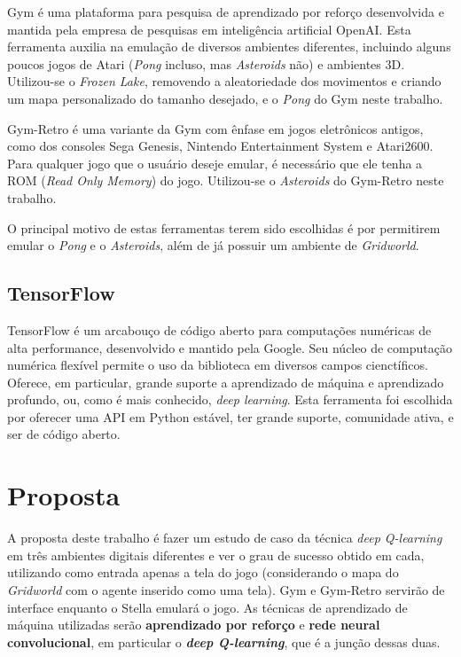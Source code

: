 Gym é uma plataforma para pesquisa de aprendizado por reforço desenvolvida e mantida pela empresa de pesquisas em inteligência artificial OpenAI.
Esta ferramenta auxilia na emulação de diversos ambientes diferentes, incluindo alguns poucos jogos de Atari (\textit{Pong} incluso, mas \textit{Asteroids} não) e ambientes 3D.
Utilizou-se o \textit{Frozen Lake}, removendo a aleatoriedade dos movimentos e criando um mapa personalizado do tamanho desejado, e o \textit{Pong} do Gym neste trabalho.

Gym-Retro é uma variante da Gym com ênfase em jogos eletrônicos antigos, como dos consoles Sega Genesis, Nintendo Entertainment System e Atari2600.
Para qualquer jogo que o usuário deseje emular, é necessário que ele tenha a ROM (\textit{Read Only Memory}) do jogo.
Utilizou-se o \textit{Asteroids} do Gym-Retro neste trabalho.

O principal motivo de estas ferramentas terem sido escolhidas é por permitirem emular o \textit{Pong} e o \textit{Asteroids}, além de já possuir um ambiente de \textit{Gridworld}.
\subsection{TensorFlow}
\label{sec:tensorflow}

TensorFlow é um arcabouço de código aberto para computações numéricas de alta performance, desenvolvido e mantido pela Google.
Seu núcleo de computação numérica flexível permite o uso da biblioteca em diversos campos cienctíficos.
Oferece, em particular, grande suporte a aprendizado de máquina e aprendizado profundo, ou, como é mais conhecido, \textit{deep learning}.
Esta ferramenta foi escolhida por oferecer uma API em Python estável, ter grande suporte, comunidade ativa, e ser de código aberto.


\section{Proposta}
\label{sec:proposta}

A proposta deste trabalho é fazer um estudo de caso da técnica \textit{deep Q-learning} em três ambientes digitais diferentes e ver o grau de sucesso obtido em cada, utilizando como entrada apenas a tela do jogo (considerando o mapa do \textit{Gridworld} com o agente inserido como uma tela).
Gym e Gym-Retro servirão de interface enquanto o Stella emulará o jogo.
As técnicas de aprendizado de máquina utilizadas serão \textbf{aprendizado por reforço} e \textbf{rede neural convolucional}, em particular o \textbf{\textit{deep Q-learning}}, que é a junção dessas duas.

